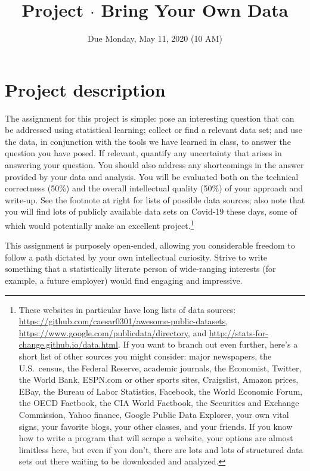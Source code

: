 \documentclass{mynotes}
\title[Project $\cdot$ SDS 323]{Project $\cdot$ Bring Your Own Data}
\date{Due Monday, May 11, 2020 (10 AM)}  %
\begin{document}
\maketitle%


\section{Project description}

The assignment for this project is simple: pose an interesting question that can be addressed using statistical learning; collect or find a relevant data set; and use the data, in conjunction with the tools we have learned in class, to answer the question you have posed.  If relevant, quantify any uncertainty that arises in answering your question.  You should also address any shortcomings in the answer provided by your data and analysis.   You will be evaluated both on the technical correctness (50\%) and the overall intellectual quality (50\%) of your approach and write-up.  See the footnote at right for lists of possible data sources; also note that you will find lots of publicly available data sets on Covid-19 these days, some of which would potentially make an excellent project.\footnote{These websites in particular have long lists of data sources: \url{https://github.com/caesar0301/awesome-public-datasets}, \url{https://www.google.com/publicdata/directory}, and  \url{http://stats-for-change.github.io/data.html}.   If you want to branch out even further, here's a short list of other sources you might consider: major newspapers, the U.S.~census, the Federal Reserve, academic journals, the Economist, Twitter, the World Bank, ESPN.com or other sports sites, Craigslist, Amazon prices, EBay, the Bureau of Labor Statistics, Facebook, the World Economic Forum, the OECD Factbook, the CIA World Factbook, the Securities and Exchange Commission, Yahoo finance, Google Public Data Explorer,  your own vital signs, your favorite blogs, your other classes, and your friends.  If you know how to write a program that will scrape a website, your options are almost limitless here, but even if you don't, there are lots and lots of structured data sets out there waiting to be downloaded and analyzed.}

This assignment is purposely open-ended, allowing you considerable freedom to follow a path dictated by your own intellectual curiosity.  Strive to write something that a statistically literate person of wide-ranging interests (for example, a future employer) would find engaging and impressive.
\end{document}
